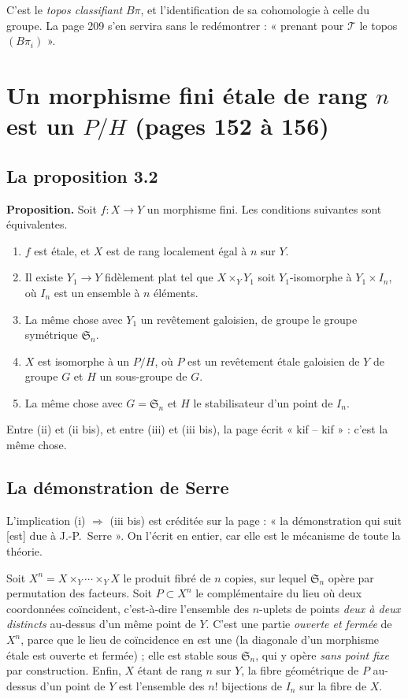 \documentclass[11pt,a4paper]{article}
\begin{document}
C'est le \emph{topos classifiant} $B\pi$, et l'identification de sa cohomologie
à celle du groupe. La page 209 s'en servira sans le redémontrer : « prenant
pour $\mathcal{T}$ le topos $(B\pi_{i})$ ».

\section*{Un morphisme fini étale de rang $n$ est un $P/H$ (pages 152 à 156)}

\subsection*{La proposition 3.2}

\textbf{Proposition.} Soit $f : X \to Y$ un morphisme fini. Les conditions
suivantes sont équivalentes.

\begin{enumerate}
  \item[(i)] $f$ est étale, et $X$ est de rang localement égal à $n$ sur $Y$.
  \item[(ii)] Il existe $Y_{1} \to Y$ fidèlement plat tel que
    $X \times_{Y} Y_{1}$ soit $Y_{1}$-isomorphe à $Y_{1} \times I_{n}$, où
    $I_{n}$ est un ensemble à $n$ éléments.
  \item[(ii bis)] La même chose avec $Y_{1}$ un revêtement galoisien, de groupe
    le groupe symétrique $\mathfrak{S}_{n}$.
  \item[(iii)] $X$ est isomorphe à un $P/H$, où $P$ est un revêtement étale
    galoisien de $Y$ de groupe $G$ et $H$ un sous-groupe de $G$.
  \item[(iii bis)] La même chose avec $G = \mathfrak{S}_{n}$ et $H$ le
    stabilisateur d'un point de $I_{n}$.
\end{enumerate}

Entre (ii) et (ii bis), et entre (iii) et (iii bis), la page écrit
« kif -- kif » : c'est la même chose.

\subsection*{La démonstration de Serre}

L'implication (i) $\Rightarrow$ (iii bis) est créditée sur la page : « la
démonstration qui suit [est] due à J.-P.\ Serre ». On l'écrit en entier, car
elle est le mécanisme de toute la théorie.

Soit $X^{n} = X \times_{Y} \cdots \times_{Y} X$ le produit fibré de $n$
copies, sur lequel $\mathfrak{S}_{n}$ opère par permutation des facteurs. Soit
$P \subset X^{n}$ le complémentaire du lieu où deux coordonnées coïncident,
c'est-à-dire l'ensemble des $n$-uplets de points \emph{deux à deux distincts}
au-dessus d'un même point de $Y$. C'est une partie \emph{ouverte et fermée} de
$X^{n}$, parce que le lieu de coïncidence en est une (la diagonale d'un
morphisme étale est ouverte et fermée) ; elle est stable sous
$\mathfrak{S}_{n}$, qui y opère \emph{sans point fixe} par construction. Enfin,
$X$ étant de rang $n$ sur $Y$, la fibre géométrique de $P$ au-dessus d'un point
de $Y$ est l'ensemble des $n!$ bijections de $I_{n}$ sur la fibre de
$X$.
\end{document}
